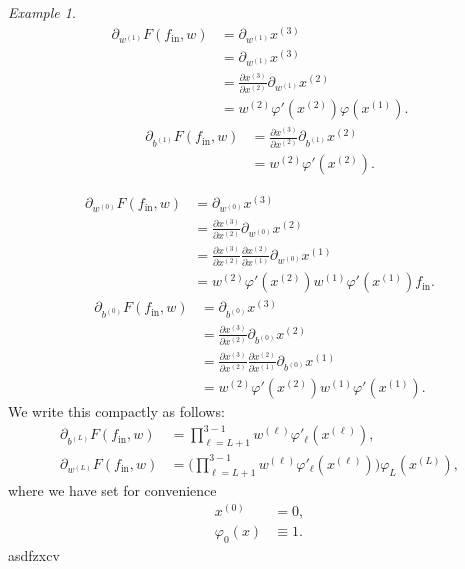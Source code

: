 \documentclass[10pt, a4paper]{article}
\theoremstyle{plain}
\theoremstyle{definition}
\theoremstyle{definition}
\theoremstyle{definition}
\theoremstyle{definition}
\theoremstyle{definition}
\theoremstyle{definition}
\theoremstyle{definition}
\theoremstyle{remark}
\theoremstyle{remark}
\newtheorem{example}[theorem]{Example}
\theoremstyle{rudin-style-generic}
\theoremstyle{rudin-style-generic*}
\theoremstyle{rudin-style-theorem}
\begin{document}
\begin{example}
\begin{align*}
	\partial_{w^{(1)}} F(f_{\text{in}}, w)
	&= \partial_{w^{(1)}}   x^{(3)}  \\
	&= \partial_{w^{(1)}} x^{(3)} \\
	&= \frac{\partial x^{(3)} }{ \partial x^{(2)} } \partial_{w^{(1)}} x^{(2)} \\
	&=  w^{(2)} \varphi'( x^{(2)} ) \varphi( x^{(1)} ) 
	.
\end{align*}
\begin{align*}
	\partial_{b^{(1)}} F(f_{\text{in}}, w)
	&= 
	\frac{\partial x^{(3)}}{\partial x^{(2)}} \partial_{b^{(1)}} x^{(2)}\\
	&=
	w^{(2)}\varphi'(x^{(2)}) 
	.
\end{align*}

\begin{align*}
	\partial_{w^{(0)}} F(f_{\text{in}}, w)
	&= \partial_{w^{(0)}} x^{(3)} \\
	&= \frac{\partial x^{(3)}}{\partial x^{(2)}} \partial_{w^{(0)}} x^{(2)} \\
	&= \frac{\partial x^{(3)}}{\partial x^{(2)}} \frac{ \partial x^{(2)} } {\partial x^{(1)} } \partial_{w^{(0)}} x^{(1)} \\
	&= w^{(2)} \varphi'( x^{(2)} ) w^{(1)} \varphi'(x^{(1)} ) f_{\text{in}}
	.
\end{align*}
\begin{align*}
	\partial_{b^{(0)}} F(f_{\text{in}}, w)
	&= \partial_{b^{(0)}} x^{(3)} \\
	&= \frac{\partial x^{(3)}}{\partial x^{(2)}} \partial_{b^{(0)}} x^{(2)} \\
	&= \frac{\partial x^{(3)}}{\partial x^{(2)}} \frac{ \partial x^{(2)} } {\partial x^{(1)} } \partial_{b^{(0)}} x^{(1)} \\
	&= w^{(2)} \varphi'( x^{(2)} ) w^{(1)} \varphi'(x^{(1)}) 
	.
\end{align*}
We write this compactly as follows:
\begin{align*}
	\partial_{b^{(L)}} F( f_{\text{in}}, w )
			&= \prod_{\ell=L+1}^{3-1} w^{(\ell)} \varphi'_{\ell}( x^{(\ell)} ), \\ 
	\partial_{w^{(L)}} F( f_{\text{in}}, w )
			&= \big(\prod_{\ell=L+1}^{3-1} w^{(\ell)} \varphi'_{\ell}( x^{(\ell)} ) \big) \varphi_L(x^{(L)})
	,
\end{align*}
where we have set for convenience
\begin{align*} 
	x^{(0)} &= 0 ,\\
	\varphi_{0}(x) &\equiv 1
	.
\end{align*}
asdfzxcv
\end{example}
\end{document}
